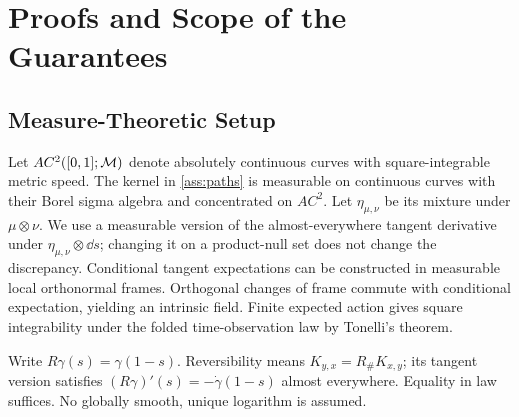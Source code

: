 \section{Proofs and Scope of the Guarantees}
\label{app:proofs}
\subsection{Measure-Theoretic Setup}
Let $AC^2([0,1];\mathcal M)$ denote absolutely continuous curves with square-integrable metric speed. The kernel in \cref{ass:paths} is measurable on continuous curves with their Borel sigma algebra and concentrated on $AC^2$. Let $\eta_{\mu,\nu}$ be its mixture under $\mu\otimes\nu$. We use a measurable version of the almost-everywhere tangent derivative under $\eta_{\mu,\nu}\otimes\dd s$; changing it on a product-null set does not change the discrepancy. Conditional tangent expectations can be constructed in measurable local orthonormal frames. Orthogonal changes of frame commute with conditional expectation, yielding an intrinsic field. Finite expected action gives square integrability under the folded time-observation law by Tonelli's theorem.

Write $R\gamma(s)=\gamma(1-s)$. Reversibility means $K_{y,x}=R_\#K_{x,y}$; its tangent version satisfies $(R\gamma)'(s)=-\dot\gamma(1-s)$ almost everywhere. Equality in law suffices. No globally smooth, unique logarithm is assumed.


